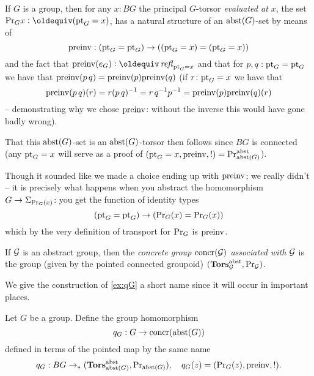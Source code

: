 \begin{example}\label{ex:qG}
  If $G$ is a group, then for any $x:BG$ the principal $G$-torsor \emph{evaluated at $x$}, \ie the set $\princ Gx\defequi(\pt_G=x)$, has a natural structure of an $\mathrm{abst}(G)$-set by means of 
$$\mathrm{preinv}:({\mathord{\mathrm{pt}}}_G={\mathord{\mathrm{pt}}}_G)\to (({\mathord{\mathrm{pt}}}_G=x)=({\mathord{\mathrm{pt}}}_G=x))$$ and the fact that $\preinv(e_G)\defequi\refl{\pt_G=x}$ and that for $p,q:{\mathord{\mathrm{pt}}}_G={\mathord{\mathrm{pt}}}_G$ we have that  $\mathrm{preinv}(p\,q)=\mathrm{preinv}(p)\mathrm{preinv}(q)$ (\ie if $r\colon {\mathord{\mathrm{pt}}}_G=x$ we have that 
$$\mathrm{preinv}(p\, q)(r)=r(p\,q)^{-1}=r\,q^{-1}p^{-1}=\mathrm{preinv}(p)\mathrm{preinv}(q)(r)$$  -- demonstrating why we chose $\mathrm{preinv}$: without the inverse this would have gone badly wrong).  

That this $\mathrm{abst}(G)$-set is an $\mathrm{abst}(G)$-torsor then follows since $BG$ is connected (any ${\mathord{\mathrm{pt}}}_G=x$ will serve as a proof of $({\mathord{\mathrm{pt}}}_G=x,\mathrm{preinv},!)=\mathrm{Pr}_{{\mathrm{abst}(G)}}^{\mathrm{abst}}$).

Though it sounded like we made a choice ending up with $\mathrm{preinv}$; we really didn't -- it is precisely what happens when you abstract the homomorphism $G\to\Sigma_{\mathrm{Pr}_{{G}}(x)}$: 
you get the function of identity types 
$$({\mathord{\mathrm{pt}}}_G={\mathord{\mathrm{pt}}}_G)\to (\mathrm{Pr}_{{G}}(x)=\mathrm{Pr}_{{G}}(x))$$ 
which by the very definition of transport for $\mathrm{Pr}_{{G}}$ is $\mathrm{preinv}$. 
\end{example}

\begin{definition}
  If ${\mathcal G}$ is an abstract group, then the \emph{concrete group $\mathrm{concr}({\mathcal G})$ associated with ${\mathcal G}$} is the group (given by the pointed connected groupoid) $(\mathbf{Tors}_{\mathcal G}^{\mathrm{abst}},\mathrm{Pr}_{{\mathcal G}})$.
\end{definition}
We give the construction of \cref{ex:qG} a short name since it will occur in important places.
\begin{definition}
  Let $G$ be a group.  Define the group homomorphism 
 $$q_G:G\to \mathrm{concr}(\mathrm{abst}(G))$$ defined in terms of the pointed map by the same name
$$q_G:BG\to_* (\mathbf{Tors}^{\mathrm{abst}}_{\mathrm{abst}(G)},\mathrm{Pr}_{{\mathrm{abst}(G)}}),\quad q_G(z)=(\mathrm{Pr}_{{G}}(z),\mathrm{preinv},!).$$
\end{definition}

